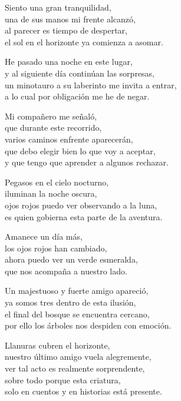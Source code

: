 \begin{center}
\vspace{1em} 
Siento una gran tranquilidad,\\ 
una de sus manos mi frente alcanzó,\\ 
al parecer es tiempo de despertar,\\ 
el sol en el horizonte ya comienza a asomar.

\vspace{1em} 
He pasado una noche en este lugar,\\ 
y al siguiente día continúan las sorpresas,\\ 
un minotauro a su laberinto me invita a entrar,\\ 
a lo cual por obligación me he de negar.

\vspace{1em} 
Mi compañero me señaló,\\ 
que durante este recorrido,\\ 
varios caminos enfrente aparecerán,\\ 
que debo elegir bien lo que voy a aceptar,\\ 
y que tengo que aprender a algunos rechazar.

\vspace{1em} 
Pegasos en el cielo nocturno,\\ 
iluminan la noche oscura,\\ 
ojos rojos puedo ver observando a la luna,\\ 
es quien gobierna esta parte de la aventura.

\vspace{1em} 
Amanece un día más,\\ 
los ojos rojos han cambiado,\\ 
ahora puedo ver un verde esmeralda,\\ 
que nos acompaña a nuestro lado.

\vspace{1em} 
Un majestuoso y fuerte amigo apareció,\\ 
ya somos tres dentro de esta ilusión,\\ 
el final del bosque se encuentra cercano,\\ 
por ello los árboles nos despiden con emoción.

\vspace{10em} 
Llanuras cubren el horizonte,\\ 
nuestro último amigo vuela alegremente,\\ 
ver tal acto es realmente sorprendente,\\ 
sobre todo porque esta criatura,\\ 
solo en cuentos y en historias está presente.


\end{center}

